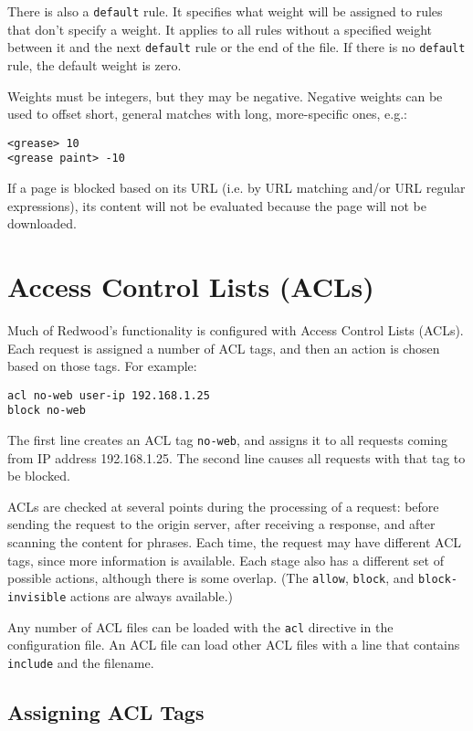 \documentclass{article}
\begin{document}
There is also a \verb"default" rule. It specifies what weight will be assigned to rules that don't specify a weight. 
It applies to all rules without a specified weight between it and the next \verb"default" rule or the end of the file. 
If there is no \verb"default" rule, the default weight is zero.

Weights must be integers, but they may be negative. Negative weights can be used to offset short, general matches 
with long, more-specific ones, e.g.:

\begin{verbatim}
<grease> 10
<grease paint> -10
\end{verbatim}

If a page is blocked based on its URL (i.e. by URL matching and/or URL regular expressions), 
its content will not be evaluated because the page will not be downloaded.

\section{Access Control Lists (ACLs)}

Much of Redwood's functionality is configured with Access Control Lists (ACLs).
Each request is assigned a number of ACL tags, and then an action is chosen based on those tags.
For example:

\begin{verbatim}
acl no-web user-ip 192.168.1.25
block no-web
\end{verbatim}

The first line creates an ACL tag \verb"no-web", and assigns it to all requests coming from IP address 192.168.1.25.
The second line causes all requests with that tag to be blocked.

ACLs are checked at several points during the processing of a request:
before sending the request to the origin server, after receiving a response,
and after scanning the content for phrases. 
Each time, the request may have different ACL tags, since more information is available.
Each stage also has a different set of possible actions, 
although there is some overlap.
(The \verb"allow", \verb"block", and \verb"block-invisible" actions are always available.)

Any number of ACL files can be loaded with the \verb"acl" directive in the configuration file.
An ACL file can load other ACL files with a line that contains \verb"include" and the filename.

\subsection{Assigning ACL Tags}
\end{document}
